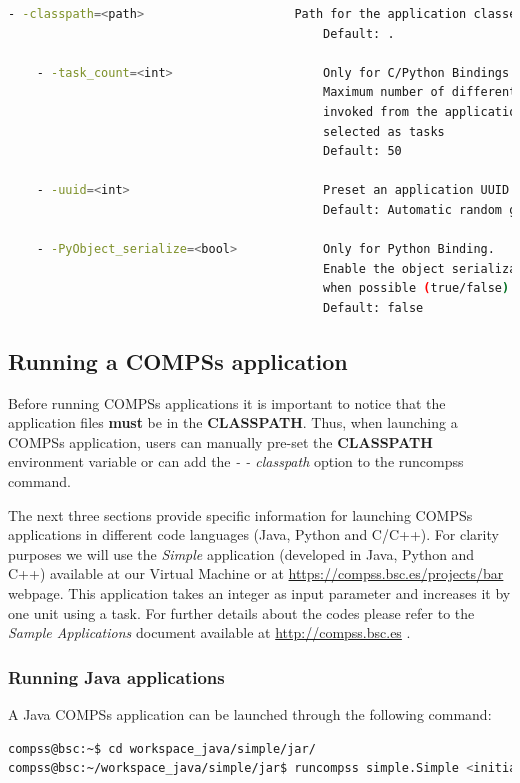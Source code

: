 \begin{lstlisting}[language=bash]
    - -classpath=<path>                     Path for the application classes / modules
                                            Default: .
                                            
    - -task_count=<int>                     Only for C/Python Bindings. 
                                            Maximum number of different functions/methods
                                            invoked from the application that have been 
                                            selected as tasks
                                            Default: 50
                                            
    - -uuid=<int>                           Preset an application UUID
                                            Default: Automatic random generation
                                            
    - -PyObject_serialize=<bool>            Only for Python Binding. 
                                            Enable the object serialization to string 
                                            when possible (true/false).
                                            Default: false

\end{lstlisting}

\subsection{Running a COMPSs application}
\label{subsec:running_compss}
Before running COMPSs applications it is important to notice that the application files \textbf{must} be in the \textbf{CLASSPATH}.
Thus, when launching a COMPSs application, users can manually pre-set the \textbf{CLASSPATH} environment variable
or can add the \textit{- - classpath} option to the runcompss command.

The next three sections provide specific information for launching COMPSs applications in different code languages (Java, Python and 
C/C++). For clarity purposes we will use the \textit{Simple} application (developed in Java, Python and C++) available at our
Virtual Machine or at \url{https://compss.bsc.es/projects/bar} webpage. This application takes an integer as input
parameter and increases it by one unit using a task. For further details about the codes please refer to the \textit{Sample 
Applications} document available at \url{http://compss.bsc.es} .

\subsubsection{Running Java applications}
A Java COMPSs application can be launched through the following command:
\begin{lstlisting}[language=bash]
compss@bsc:~$ cd workspace_java/simple/jar/
compss@bsc:~/workspace_java/simple/jar$ runcompss simple.Simple <initial_number>
\end{lstlisting}

